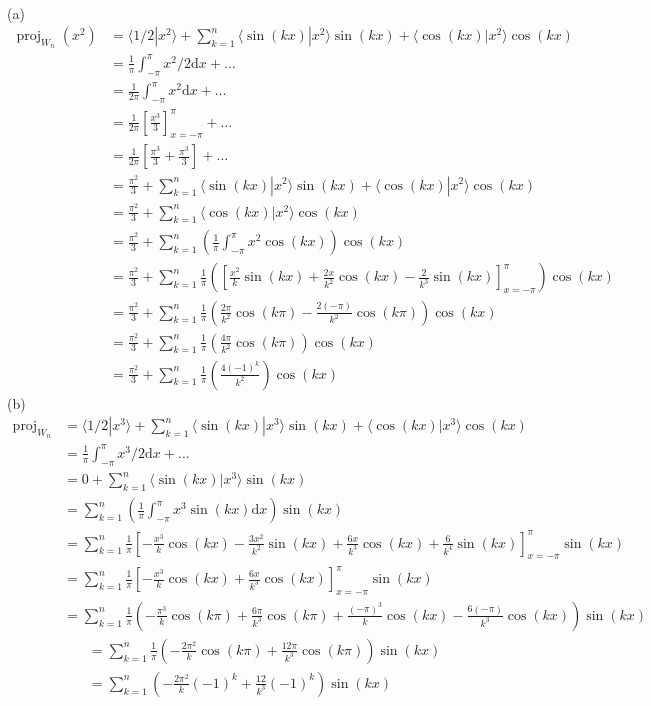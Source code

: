 \documentclass{report}
\begin{document}
\sol \\
(a)
$$
\begin{aligned}
\operatorname{proj}_{W_n}(x^2) &= \langle 1/2 | x^2 \rangle + \sum_{k=1}^n \langle \sin(kx) | x^2 \rangle\sin(kx) + \langle\cos(kx)|x^2\rangle\cos(kx)\\
&=\frac{1}{\pi}\int_{-\pi}^\pi x^2/2\mathrm{d}x + \ldots\\
&=\frac{1}{2\pi}\int_{-\pi}^\pi x^2\mathrm{d}x + \ldots\\
&=\frac{1}{2\pi}\left[\frac{x^3}{3}\right]_{x=-\pi}^\pi + \ldots\\
&=\frac{1}{2\pi}\left[\frac{\pi^3}{3}+\frac{\pi^3}{3}\right]+\ldots\\
&=\frac{\pi^2}{3} + \sum_{k=1}^n \langle \sin(kx) | x^2 \rangle\sin(kx) + \langle\cos(kx)|x^2\rangle\cos(kx)\\
&=\frac{\pi^2}{3} + \sum_{k=1}^n \langle\cos(kx)|x^2\rangle\cos(kx)\\
&=\frac{\pi^2}{3} + \sum_{k=1}^n \left(\frac{1}{\pi}\int_{-\pi}^{\pi}x^2\cos(kx)\right)\cos(kx)\\
&=\frac{\pi^2}{3} + \sum_{k=1}^n \frac{1}{\pi}\left(\left[\frac{x^2}{k}\sin(kx)+\frac{2x}{k^2}\cos(kx)-\frac{2}{k^3}\sin(kx)\right]_{x=-\pi}^\pi\right)\cos(kx)\\
&=\frac{\pi^2}{3} + \sum_{k=1}^n \frac{1}{\pi}\left(\frac{2\pi}{k^2}\cos(k\pi)-\frac{2(-\pi)}{k^2}\cos(k\pi)\right)\cos(kx)\\
&=\frac{\pi^2}{3} + \sum_{k=1}^n \frac{1}{\pi}\left(\frac{4\pi}{k^2}\cos(k\pi)\right)\cos(kx)\\
&=\frac{\pi^2}{3} + \sum_{k=1}^n \frac{1}{\pi}\left(\frac{4(-1)^k}{k^2}\right)\cos(kx)
\end{aligned}
$$
(b)
$$
\begin{aligned}
\operatorname{proj}_{W_n} &= \langle 1/2 | x^3 \rangle + \sum_{k=1}^n\langle\sin(kx)|x^3\rangle\sin(kx) + \langle\cos(kx)|x^3\rangle\cos(kx)\\
&=\frac{1}{\pi}\int_{-\pi}^\pi x^3/2 \mathrm{d}x + \ldots\\
&=0+\sum_{k=1}^n \langle\sin(kx)|x^3\rangle\sin(kx)\\
&=\sum_{k=1}^n\left(\frac{1}{\pi}\int_{-\pi}^\pi x^3\sin(kx)\mathrm{d}x\right)\sin(kx)\\
&=\sum_{k=1}^n\frac{1}{\pi}\left[-\frac{x^3}{k}\cos(kx)-\frac{3x^2}{k^2}\sin(kx)+\frac{6x}{k^3}\cos(kx)+\frac{6}{k^4}\sin(kx)\right]_{x=-\pi}^\pi\sin(kx)\\
&=\sum_{k=1}^n\frac{1}{\pi}\left[-\frac{x^3}{k}\cos(kx)+\frac{6x}{k^3}\cos(kx)\right]_{x=-\pi}^\pi\sin(kx)\\
&=\sum_{k=1}^n\frac{1}{\pi}\left(-\frac{\pi^3}{k}\cos(k\pi)+\frac{6\pi}{k^3}\cos(k\pi)+\frac{(-\pi)^3}{k}\cos(kx)-\frac{6(-\pi)}{k^3}\cos(kx)\right)\sin(kx)
\end{aligned}
$$
$$
\begin{aligned}
&=\sum_{k=1}^n \frac{1}{\pi}\left(-\frac{2\pi^2}{k}\cos(k\pi)+\frac{12\pi}{k^3}\cos(k\pi)\right)\sin(kx)\\
&=\sum_{k=1}^n \left(-\frac{2\pi^2}{k}(-1)^k+\frac{12}{k^3}(-1)^k\right)\sin(kx)
\end{aligned}
$$
\end{document}
